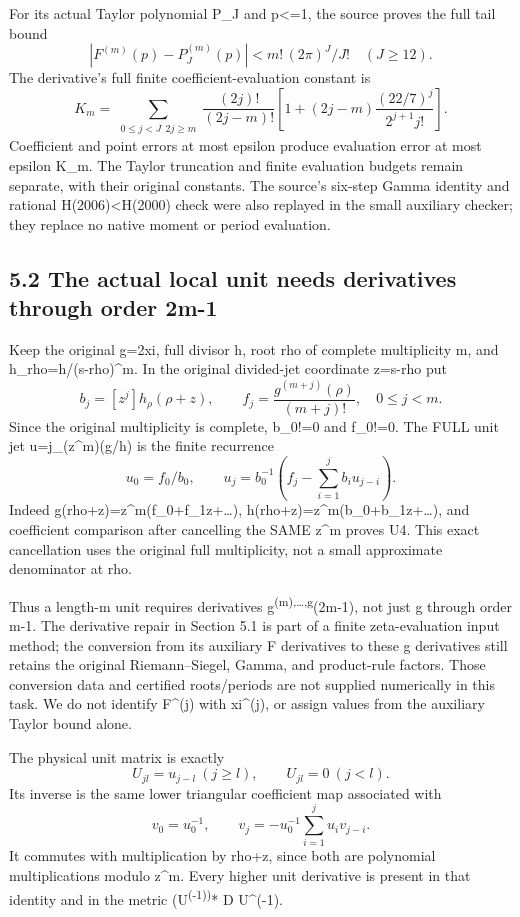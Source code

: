 For its actual Taylor polynomial P\_J and \textbar p\textbar\textless=1, the source proves the full tail bound \[
 |F^{(m)}(p)-P_J^{(m)}(p)|<m!\,(2\pi)^J/J!\quad(J\ge12).
 \tag{U1}
\] The derivative's full finite coefficient-evaluation constant is \[
 K_m=\sum_{\substack{0\le j<J\ \ 2j\ge m}}
 \frac{(2j)!}{(2j-m)!}
 \left[1+(2j-m)\frac{(22/7)^j}{2^{j+1}j!}\right].
 \tag{U2}
\] Coefficient and point errors at most epsilon produce evaluation error at most epsilon K\_m. The Taylor truncation and finite evaluation budgets remain separate, with their original constants. The source's six-step Gamma identity and rational H(2006)\textless H(2000) check were also replayed in the small auxiliary checker; they replace no native moment or period evaluation.

\subsection{5.2 The actual local unit needs derivatives through order 2m-1}\label{the-actual-local-unit-needs-derivatives-through-order-2m-1}

Keep the original g=2xi, full divisor h, root rho of complete multiplicity m, and h\_rho=h/(s-rho)\^{}m. In the original divided-jet coordinate z=s-rho put \[
 b_j=[z^j]h_\rho(\rho+z),\qquad
 f_j=\frac{g^{(m+j)}(\rho)}{(m+j)!},\quad0\le j<m.
 \tag{U3}
\] Since the original multiplicity is complete, b\_0!=0 and f\_0!=0. The FULL unit jet u=j\_(z\^{}m)(g/h) is the finite recurrence \[
 \boxed{u_0=f_0/b_0,\qquad
 u_j=b_0^{-1}\left(f_j-\sum_{i=1}^j b_i u_{j-i}\right).}\tag{U4}
\] Indeed g(rho+z)=z\^{}m(f\_0+f\_1z+\ldots), h(rho+z)=z\^{}m(b\_0+b\_1z+\ldots), and coefficient comparison after cancelling the SAME z\^{}m proves U4. This exact cancellation uses the original full multiplicity, not a small approximate denominator at rho.

Thus a length-m unit requires derivatives g\textsuperscript{(m),\ldots,g}(2m-1), not just g through order m-1. The derivative repair in Section 5.1 is part of a finite zeta-evaluation input method; the conversion from its auxiliary F derivatives to these g derivatives still retains the original Riemann--Siegel, Gamma, and product-rule factors. Those conversion data and certified roots/periods are not supplied numerically in this task. We do not identify F\^{}(j) with xi\^{}(j), or assign values from the auxiliary Taylor bound alone.

The physical unit matrix is exactly \[
 U_{jl}=u_{j-l}\ (j\ge l),\qquad U_{jl}=0\ (j<l).
\] Its inverse is the same lower triangular coefficient map associated with \[
 v_0=u_0^{-1},\qquad
 v_j=-u_0^{-1}\sum_{i=1}^j u_i v_{j-i}.\tag{U5}
\] It commutes with multiplication by rho+z, since both are polynomial multiplications modulo z\^{}m. Every higher unit derivative is present in that identity and in the metric (U\textsuperscript{(-1))}* D U\^{}(-1).

